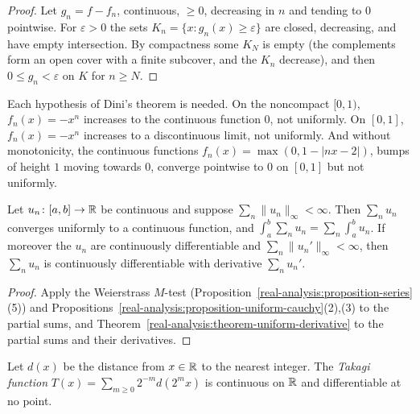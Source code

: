 \begin{proof}
Let $g_n = f - f_n$, continuous, $\geq 0$, decreasing in $n$ and tending to $0$ pointwise. For $\varepsilon > 0$ the sets $K_n = \{x : g_n(x) \geq \varepsilon\}$ are closed, decreasing, and have empty intersection. By
compactness some $K_N$ is empty (the complements form an open cover with a finite subcover, and the $K_n$ decrease), and then $0 \leq g_n < \varepsilon$ on $K$ for $n \geq N$.
\end{proof}

\begin{counterexample}\label{real-analysis:counterexample-dini}
Each hypothesis of Dini's theorem is needed. On the noncompact $[0, 1)$, $f_n(x) = -x^n$ increases to the continuous function $0$, not uniformly. On $[0, 1]$, $f_n(x) = -x^n$ increases to a discontinuous limit, not
uniformly. And without monotonicity, the continuous functions $f_n(x) = \max(0, 1 - |nx - 2|)$, bumps of height $1$ moving towards $0$, converge pointwise to $0$ on $[0, 1]$ but not uniformly.
\end{counterexample}

\begin{corollary}\label{real-analysis:corollary-series-functions}
Let $u_n \colon [a, b] \to \mathbb{R}$ be continuous and suppose $\sum_n\|u_n\|_\infty < \infty$. Then $\sum_nu_n$ converges uniformly to a continuous function, and $\int_a^b\sum_nu_n = \sum_n\int_a^bu_n$. If moreover
the $u_n$ are continuously differentiable and $\sum_n\|u_n'\|_\infty < \infty$, then $\sum_nu_n$ is continuously differentiable with derivative $\sum_nu_n'$.
\end{corollary}

\begin{proof}
Apply the Weierstrass $M$-test (Proposition~\ref{real-analysis:proposition-series}(5)) and Propositions~\ref{real-analysis:proposition-uniform-cauchy}(2),(3) to the partial sums, and Theorem~\ref{real-analysis:theorem-uniform-derivative}
to the partial sums and their derivatives.
\end{proof}

\begin{theorem}\label{real-analysis:theorem-takagi}
Let $d(x)$ be the distance from $x \in \mathbb{R}$ to the nearest integer. The \emph{Takagi function} $T(x) = \sum_{m \geq 0}2^{-m}d(2^mx)$ is continuous on $\mathbb{R}$ and differentiable at no point.
\end{theorem}

